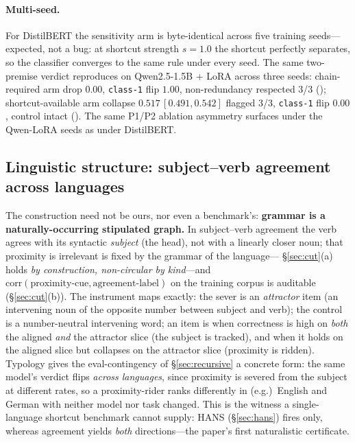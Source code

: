 \paragraph{Multi-seed.} For DistilBERT the sensitivity arm is byte-identical
across five training seeds---expected, not a bug: at shortcut strength $s=1.0$
the shortcut perfectly separates, so the classifier converges to the same rule
under every seed. The same two-premise verdict reproduces on Qwen2.5-1.5B + LoRA
across three seeds: chain-required arm \doc{} drop $0.00$, \texttt{class-1} flip
$1.00$, non-redundancy respected 3/3 (\scg{}); shortcut-available arm \doc{}
collapse $0.517\,[0.491,0.542]$ flagged 3/3, \texttt{class-1} flip $0.00$,
control intact (\scs{}). The same P1/P2 ablation asymmetry surfaces under
the Qwen-LoRA seeds as under DistilBERT.

\subsection{Linguistic structure: subject--verb agreement across
languages}\label{sec:agreement}
The construction need not be ours, nor even a benchmark's: \textbf{grammar is a
naturally-occurring stipulated graph.} In subject--verb agreement the verb agrees
with its syntactic \emph{subject} (the head), not with a linearly closer noun;
that proximity is irrelevant is fixed by the grammar of the language---%
\S\ref{sec:cut}(a) holds \emph{by construction, non-circular by kind}---and
$\mathrm{corr}(\text{proximity-cue},\text{agreement-label})$ on the training
corpus is auditable (\S\ref{sec:cut}(b)). The instrument maps exactly: the
\doc{} sever is an \emph{attractor} item (an intervening noun of the opposite
number between subject and verb); the \dctwo{} control is a number-neutral
intervening word; an item is \scg{} when correctness is high on \emph{both} the
aligned \emph{and} the attractor slice (the subject is tracked), and \scs{} when
it holds on the aligned slice but collapses on the attractor slice (proximity is
ridden). Typology gives the eval-contingency of \S\ref{sec:recursive} a concrete
form: the same model's verdict flips \emph{across languages}, since proximity is
severed from the subject at different rates, so a proximity-rider ranks
differently in (e.g.)\ English and German with neither model nor task changed.
This is the witness a single-language shortcut benchmark cannot supply: HANS
(\S\ref{sec:hans}) fires \scs{} only, whereas agreement yields \emph{both}
directions---the paper's first naturalistic \scg{} certificate.

